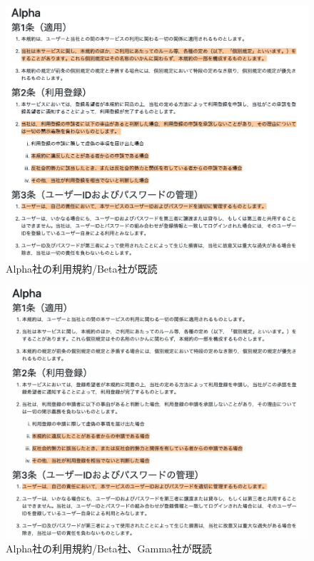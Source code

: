 \begin{figure}[h]
  \begin{center}
      \includegraphics[width=16cm]{img/alpha_b.png}
      \caption{Alpha社の利用規約/Beta社が既読}
      \label{img:Alpha社の利用規約/Beta社が既読}
  \end{center}
\end{figure}
\begin{figure}[h]
  \begin{center}
      \includegraphics[width=16cm]{img/alpha_bg.png}
      \caption{Alpha社の利用規約/Beta社、Gamma社が既読}
      \label{img:Alpha社の利用規約/Beta社、Gamma社が既読}
  \end{center}
\end{figure}
